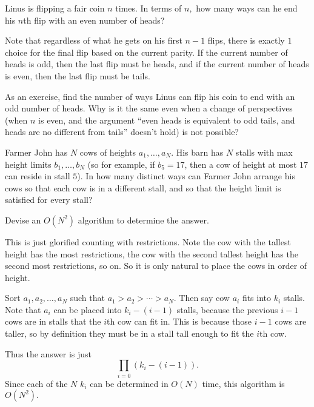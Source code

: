 \documentclass[blue,onecol]{shooting}
\begin{document}
\begin{exam}[Coins]
Linus is flipping a fair coin $n$ times. In terms of $n,$ how many ways can he end his $n$th flip with an even number of heads?
\end{exam}

\begin{sol}
Note that regardless of what he gets on his first $n-1$ flips, there is exactly $1$ choice for the final flip based on the current parity. If the current number of heads is odd, then the last flip must be heads, and if the current number of heads is even, then the last flip must be tails.
\end{sol}

As an exercise, find the number of ways Linus can flip his coin to end with an odd number of heads. Why is it the same even when a change of perspectives (when $n$ is even, and the argument ``even heads is equivalent to odd tails, and heads are no different from tails'' doesn't hold) is not possible?


\begin{exam}
Farmer John has $N$ cows of heights $a_1,\ldots,a_N.$ His barn has $N$ stalls with max height limits $b_1,\ldots,b_N$ (so for example, if $b_5=17$, then a cow of height at most $17$ can reside in stall $5$). In how many distinct ways can Farmer John arrange his cows so that each cow is in a different stall, and so that the height limit is satisfied for every stall? 

Devise an $O(N^2)$ algorithm to determine the answer.
\end{exam}

\begin{sol}
This is just glorified counting with restrictions. Note the cow with the tallest height has the most restrictions, the cow with the second tallest height has the second most restrictions, so on. So it is only natural to place the cows in order of height.

Sort $a_1,a_2,\ldots,a_N$ such that $a_1>a_2>\cdots>a_N.$ Then say cow $a_i$ fits into $k_i$ stalls. Note that $a_i$ can be placed into $k_i-(i-1)$ stalls, because the previous $i-1$ cows are in stalls that the $i$th cow can fit in. This is because those $i-1$ cows are taller, so by definition they must be in a stall tall enough to fit the $i$th cow.

Thus the answer is just
\[\prod_{i=0}(k_i-(i-1)).\]
Since each of the $N$ $k_i$ can be determined in $O(N)$ time, this algorithm is $O(N^2).$
\end{sol}
\end{document}
